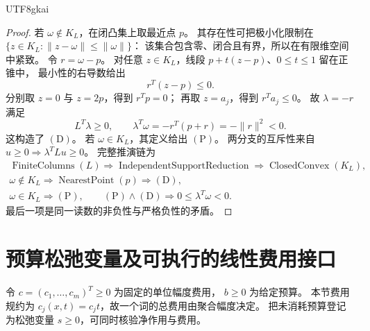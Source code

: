 \documentclass[12pt,a4paper,openany,notitlepage]{report}
\theoremstyle{plain}
\theoremstyle{definition}
\theoremstyle{remark}
\def\mathcal#1{#1}\def\mathsf#1{#1}\def\mathbb#1{#1}%
\begin{document}
\begin{CJK*}{UTF8}{gkai}
\begin{proof}
若 $\omega\notin\mathcal K_L$，在闭凸集上取最近点 $p$。
其存在性可把极小化限制在
$\{z\in\mathcal K_L:\|z-\omega\|\le\|\omega\|\}$：
该集合包含零、闭合且有界，所以在有限维空间中紧致。
令 $r=\omega-p$。
对任意 $z\in\mathcal K_L$，线段 $p+t(z-p)$、$0\le t\le1$ 留在正锥中，
最小性的右导数给出
\[
 r^{\mathsf T}(z-p)\le0.
\]
分别取 $z=0$ 与 $z=2p$，得到 $r^{\mathsf T}p=0$；
再取 $z=a_j$，得到 $r^{\mathsf T}a_j\le0$。
故 $\lambda=-r$ 满足
\[
 L^{\mathsf T}\lambda\ge0,\qquad
 \lambda^{\mathsf T}\omega
 =-r^{\mathsf T}(p+r)=-\|r\|^2<0.
\]
这构造了 $\mathrm{(D)}$。
若 $\omega\in\mathcal K_L$，其定义给出 $\mathrm{(P)}$。
两分支的互斥性来自
$u\ge0\Rightarrow\lambda^{\mathsf T}Lu\ge0$。
完整推演链为
\[
 \begin{gathered}
 \operatorname{FiniteColumns}(L)
 \Rightarrow\operatorname{IndependentSupportReduction}
 \Rightarrow\operatorname{ClosedConvex}(\mathcal K_L),\\
 \omega\notin\mathcal K_L
 \Rightarrow\operatorname{NearestPoint}(p)
 \Rightarrow\mathrm{(D)},\\
 \omega\in\mathcal K_L\Rightarrow\mathrm{(P)},\qquad
 \mathrm{(P)}\land\mathrm{(D)}\Rightarrow 0\le\lambda^{\mathsf T}\omega<0.
 \end{gathered}
\]
最后一项是同一读数的非负性与严格负性的矛盾。
\end{proof}

\section{预算松弛变量及可执行的线性费用接口}
\label{exp:hom:budget-cone}

令 $c=(c_1,\ldots,c_m)^{\mathsf T}\ge0$ 为固定的单位幅度费用，
$b\ge0$ 为给定预算。
本节费用规约为 $c_j(x,t)=c_jt$，故一个词的总费用由聚合幅度决定。
把未消耗预算登记为松弛变量 $s\ge0$，可同时核验净作用与费用。


\end{CJK*}
\end{document}
